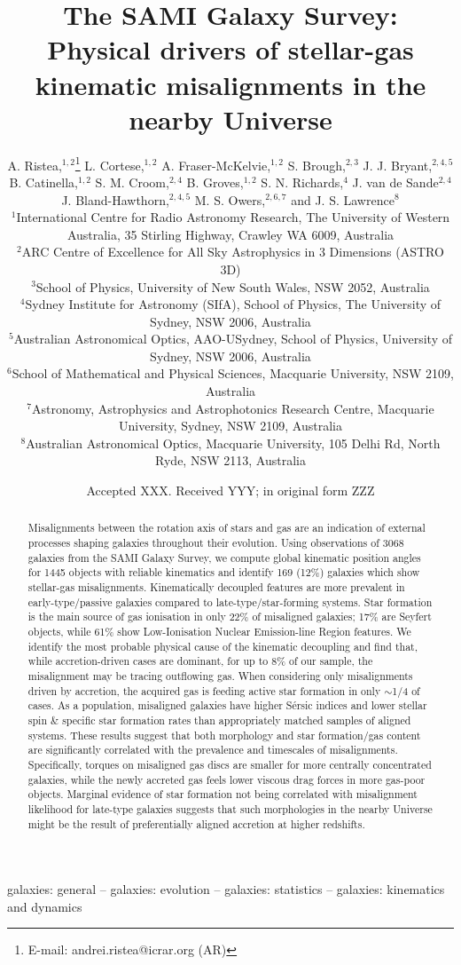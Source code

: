 \documentclass[fleqn,usenatbib]{mnras}
\title[SAMI: Drivers of stellar-gas misalignments]{The SAMI Galaxy Survey: Physical drivers of stellar-gas kinematic misalignments in the nearby Universe}
\author[A. Ristea et al.]{A. Ristea,$^{1,2}$\thanks{E-mail: andrei.ristea@icrar.org (AR)}
L. Cortese,$^{1,2}$
A. Fraser-McKelvie,$^{1,2}$
S. Brough,$^{2,3}$
J. J. Bryant,$^{2,4,5}$
B. Catinella,$^{1,2}$ 
\newauthor
S. M. Croom,$^{2,4}$
B. Groves,$^{1,2}$
S. N. Richards,$^{4}$
J. van de Sande$^{2,4}$
J. Bland-Hawthorn,$^{2,4,5}$
\newauthor
M. S. Owers,$^{2,6,7}$
and J. S. Lawrence$^{8}$
\\
$^{1}$International Centre for Radio Astronomy Research, The University of Western Australia, 35 Stirling Highway, Crawley WA 6009, Australia\\
$^{2}$ARC Centre of Excellence for All Sky Astrophysics in 3 Dimensions (ASTRO 3D) \\
$^{3}$School of Physics, University of New South Wales, NSW 2052, Australia \\
$^{4}$Sydney Institute for Astronomy (SIfA), School of Physics, The University of Sydney, NSW 2006, Australia \\
$^{5}$Australian Astronomical Optics, AAO-USydney, School of Physics, University of Sydney, NSW 2006, Australia \\
$^{6}$School of Mathematical and Physical Sciences, Macquarie University, NSW 2109, Australia \\
$^{7}$Astronomy, Astrophysics and Astrophotonics Research Centre, Macquarie University, Sydney, NSW 2109, Australia \\
$^{8}$Australian Astronomical Optics, Macquarie University, 105 Delhi Rd, North Ryde, NSW 2113, Australia
}
\date{Accepted XXX. Received YYY; in original form ZZZ}
\begin{document}
\label{firstpage}
\pagerange{\pageref{firstpage}--\pageref{lastpage}}
\maketitle


\begin{abstract}
Misalignments between the rotation axis of stars and gas are an indication of external processes shaping galaxies throughout their evolution. Using observations of 3068 galaxies from the SAMI Galaxy Survey, we compute global kinematic position angles for 1445 objects with reliable kinematics and identify 169 (12\%) galaxies which show stellar-gas misalignments. Kinematically decoupled features are more prevalent in early-type/passive galaxies compared to late-type/star-forming systems. Star formation is the main source of gas ionisation in only 22\% of misaligned galaxies; 17\% are Seyfert objects, while 61\% show Low-Ionisation Nuclear Emission-line Region features. We identify the most probable physical cause of the kinematic decoupling and find that, while accretion-driven cases are dominant, for up to 8\% of our sample, the misalignment may be tracing outflowing gas. When considering only misalignments driven by accretion, the acquired gas is feeding active star formation in only $\sim$1/4 of cases. As a population, misaligned galaxies have higher S\'ersic indices and lower stellar spin \& specific star formation rates than appropriately matched samples of aligned systems. These results suggest that both morphology and star formation/gas content are significantly correlated with the prevalence and timescales of misalignments. Specifically, torques on misaligned gas discs are smaller for more centrally concentrated galaxies, while the newly accreted gas feels lower viscous drag forces in more gas-poor objects. Marginal evidence of star formation not being correlated with misalignment likelihood for late-type galaxies suggests that such morphologies in the nearby Universe might be the result of preferentially aligned accretion at higher redshifts.
\end{abstract}

\begin{keywords}
galaxies: general -- galaxies: evolution -- galaxies: statistics -- galaxies: kinematics and dynamics 
\end{keywords}


\end{document}
